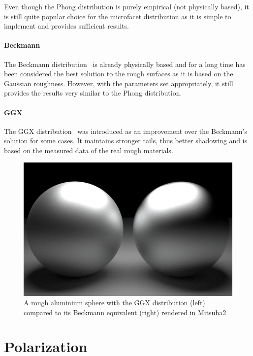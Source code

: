 Even though the Phong distribution is purely empirical (not physically based), it is still quite popular choice for the microfacet distribution as it is simple to implement and provides sufficient results.

\paragraph{Beckmann}

The Beckmann distribution~\cite{beckmann1987scattering} is already physically based and for a long time has been considered the best solution to the rough surfaces as it is based on the Gaussian roughness. However, with the parameters set appropriately, it still provides the results very similar to the Phong distribution.

\paragraph{GGX}

The GGX distribution~\cite{walter2007microfacet} was introduced as an improvement over the Beckmann's solution for some cases. It maintains stronger tails, thus better shadowing and is based on the measured data of the real rough materials.

\begin{figure}[h]
	\centering
	\includegraphics[width=.8\linewidth]{img/ggx_beckmann.png}
	\caption{A rough aluminium sphere with the GGX distribution (left) compared to its Beckmann equivalent (right) rendered  in Mitsuba2}
	\label{fig:ggx_beckmann}
\end{figure}

\section{Polarization}
\label{sec:polarization}

